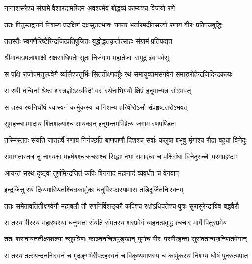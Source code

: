 \twolineshloka
{नानाशस्त्रैश्च संग्रामे वैशारद्यमरिंदम}
{अवश्यमेव बोद्धव्यं काम्यश्च विजयो रणे} %

\fourlineindentedshloka
{ततः पितुस्तद्वचनं निशम्य}
{ प्रदक्षिणं दक्षसुतप्रभावः}
{चकार भर्तारमदीनसत्त्वो}
{ रणाय वीरः प्रतिपन्नबुद्धिः} %

\twolineshloka
{ततस्तैः स्वगणैरिष्टैरिन्द्रजित्प्रतिपूजितः}
{युद्धोद्धतकृतोत्साहः संग्रामं प्रतिपद्यत} %

\twolineshloka
{श्रीमान्पद्मपलाशाक्षो राक्षसाधिपतेः सुतः}
{निर्जगाम महातेजाः समुद्र इव पर्वसु} %

\fourlineindentedshloka
{स पक्षि राजोपमतुल्यवेगै}
{र्व्यालैश्चतुर्भिः सिततीक्ष्णदंष्ट्रैः}
{रथं समायुक्तमसंगवेगं}
{ समारुरोहेन्द्रजिदिन्द्रकल्पः} %

\twolineshloka
{स रथी धन्विनां श्रेष्ठः शस्त्रज्ञोऽस्त्रविदां वरः}
{रथेनाभिययौ क्षिप्रं हनूमान्यत्र सोऽभवत्} %

\twolineshloka
{स तस्य रथनिर्घोषं ज्यास्वनं कार्मुकस्य च}
{निशम्य हरिवीरोऽसौ संप्रहृष्टतरोऽभवत्} %

\twolineshloka
{सुमहच्चापमादाय शितशल्यांश्च सायकान्}
{हनूमन्तमभिप्रेत्य जगाम रणपण्डितः} %

\fourlineindentedshloka
{तस्मिंस्ततः संयति जातहर्षे}
{ रणाय निर्गच्छति बाणपाणौ}
{दिशश्च सर्वाः कलुषा बभूवु}
{र्मृगाश्च रौद्रा बहुधा विनेदुः} %

\fourlineindentedshloka
{समागतास्तत्र तु नागयक्षा}
{ महर्षयश्चक्रचराश्च सिद्धाः}
{नभः समावृत्य च पक्षिसंघा}
{ विनेदुरुच्चैः परमप्रहृष्टाः} %

\twolineshloka
{आयन्तं सरथं दृष्ट्वा तूर्णमिन्द्रजितं कपिः}
{विननाद महानादं व्यवर्धत च वेगवान्} %

\twolineshloka
{इन्द्रजित्तु रथं दिव्यमास्थितश्चित्रकार्मुकः}
{धनुर्विस्फारयामास तडिदूर्जितनिःस्वनम्} %

\fourlineindentedshloka
{ततः समेतावतितीक्ष्णवेगौ}
{ महाबलौ तौ रणनिर्विशङ्कौ}
{कपिश्च रक्षोऽधिपतेश्च पुत्रः}
{ सुरासुरेन्द्राविव बद्धवैरौ} %

\fourlineindentedshloka
{स तस्य वीरस्य महारथस्या}
{ धनुष्मतः संयति संमतस्य}
{शरप्रवेगं व्यहनत्प्रवृद्ध}
{श्चचार मार्गे पितुरप्रमेयः} %

\fourlineindentedshloka
{ततः शरानायततीक्ष्णशल्या}
{न्सुपत्रिणः काञ्चनचित्रपुङ्खान्}
{मुमोच वीरः परवीरहन्ता}
{ सुसंततान्वज्रनिपातवेगान्} %

\fourlineindentedshloka
{स तस्य तत्स्यन्दननिःस्वनं च}
{ मृदङ्गभेरीपटहस्वनं च}
{विकृष्यमाणस्य च कार्मुकस्य}
{ निशम्य घोषं पुनरुत्पपात} %

